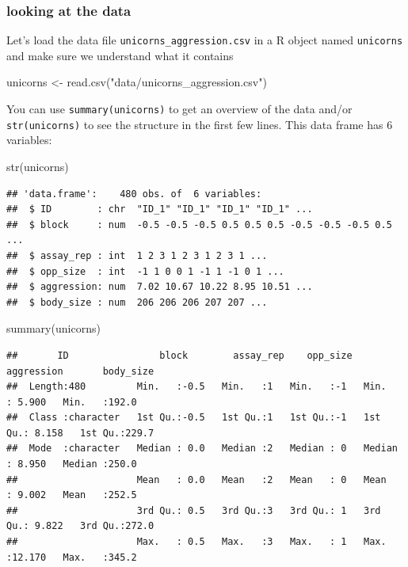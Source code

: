 \documentclass[
  12pt,
]{book}
\newenvironment{Shaded}{\begin{snugshade}}{\end{snugshade}}
\newcommand{\FunctionTok}[1]{\textcolor[rgb]{0.00,0.00,0.00}{#1}}
\newcommand{\NormalTok}[1]{#1}
\newcommand{\OtherTok}[1]{\textcolor[rgb]{0.56,0.35,0.01}{#1}}
\newcommand{\StringTok}[1]{\textcolor[rgb]{0.31,0.60,0.02}{#1}}
\begin{document}
\hypertarget{looking-at-the-data}{%
\subsubsection{looking at the data}\label{looking-at-the-data}}

Let's load the data file \texttt{unicorns\_aggression.csv} in a R object named \texttt{unicorns} and make sure we understand what it contains

\begin{Shaded}
\begin{Highlighting}[]
\NormalTok{unicorns }\OtherTok{\textless{}{-}} \FunctionTok{read.csv}\NormalTok{(}\StringTok{"data/unicorns\_aggression.csv"}\NormalTok{)}
\end{Highlighting}
\end{Shaded}

You can use \texttt{summary(unicorns)} to get an overview of the data and/or \texttt{str(unicorns)} to see the structure in the first few lines. This data frame has 6 variables:

\begin{Shaded}
\begin{Highlighting}[]
\FunctionTok{str}\NormalTok{(unicorns)}
\end{Highlighting}
\end{Shaded}

\begin{verbatim}
## 'data.frame':    480 obs. of  6 variables:
##  $ ID        : chr  "ID_1" "ID_1" "ID_1" "ID_1" ...
##  $ block     : num  -0.5 -0.5 -0.5 0.5 0.5 0.5 -0.5 -0.5 -0.5 0.5 ...
##  $ assay_rep : int  1 2 3 1 2 3 1 2 3 1 ...
##  $ opp_size  : int  -1 1 0 0 1 -1 1 -1 0 1 ...
##  $ aggression: num  7.02 10.67 10.22 8.95 10.51 ...
##  $ body_size : num  206 206 206 207 207 ...
\end{verbatim}

\begin{Shaded}
\begin{Highlighting}[]
\FunctionTok{summary}\NormalTok{(unicorns)}
\end{Highlighting}
\end{Shaded}

\begin{verbatim}
##       ID                block        assay_rep    opp_size    aggression       body_size    
##  Length:480         Min.   :-0.5   Min.   :1   Min.   :-1   Min.   : 5.900   Min.   :192.0  
##  Class :character   1st Qu.:-0.5   1st Qu.:1   1st Qu.:-1   1st Qu.: 8.158   1st Qu.:229.7  
##  Mode  :character   Median : 0.0   Median :2   Median : 0   Median : 8.950   Median :250.0  
##                     Mean   : 0.0   Mean   :2   Mean   : 0   Mean   : 9.002   Mean   :252.5  
##                     3rd Qu.: 0.5   3rd Qu.:3   3rd Qu.: 1   3rd Qu.: 9.822   3rd Qu.:272.0  
##                     Max.   : 0.5   Max.   :3   Max.   : 1   Max.   :12.170   Max.   :345.2
\end{verbatim}
\end{document}
